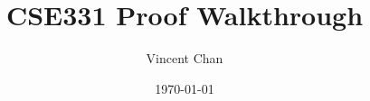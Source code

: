 \documentclass[t]{beamer}
\begin{document}
    \author{Vincent Chan}
    \title{CSE331 Proof Walkthrough}
    \date{\today}


    \begin{frame}
        \titlepage
    \end{frame}


    
\end{document}

